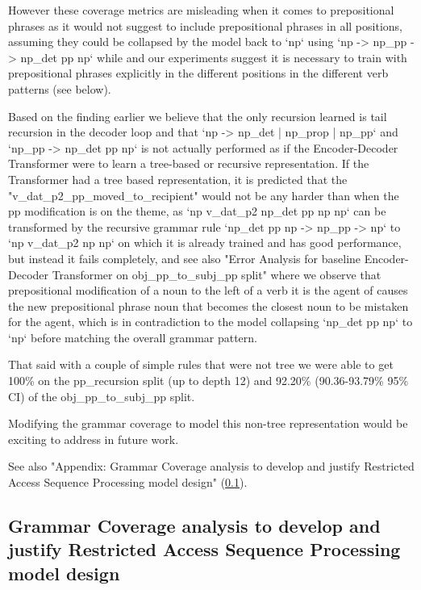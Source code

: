 \documentclass[11pt]{article}
\begin{document}
However these coverage metrics are misleading when it comes to prepositional phrases as it would not suggest to include prepositional phrases in all positions, assuming they could be collapsed by the model back to `np` using `np -> np\_pp -> np\_det pp np` while \cite{Wu2023} and our experiments suggest it is necessary to train with prepositional phrases explicitly in the different positions in the different verb patterns (see below).

Based on the finding earlier we believe that the only recursion learned is tail recursion in the decoder loop and that `np -> np\_det | np\_prop | np\_pp` and `np\_pp -> np\_det pp np` is not actually performed as if the Encoder-Decoder Transformer were to learn a tree-based or recursive representation. If the Transformer had a tree based representation, it is predicted that the "v\_dat\_p2\_pp\_moved\_to\_recipient" would not be any harder than when the pp modification is on the theme, as `np v\_dat\_p2 np\_det pp np np` can be transformed by the recursive grammar rule `np\_det pp np -> np\_pp -> np` to `np v\_dat\_p2 np np` on which it is already trained and has good performance, but instead it fails completely, and see also "Error Analysis for \cite{Wu2023} baseline Encoder-Decoder Transformer on obj\_pp\_to\_subj\_pp split" where we observe that prepositional modification of a noun to the left of a verb it is the agent of causes the new prepositional phrase noun that becomes the closest noun to be mistaken for the agent, which is in contradiction to the model collapsing `np\_det pp np` to `np` before matching the overall grammar pattern.

That said with a couple of simple rules that were not tree we were able to get 100\% on the pp\_recursion split (up to depth 12) and 92.20\% (90.36-93.79\% 95\% CI) of the obj\_pp\_to\_subj\_pp split.

Modifying the grammar coverage to model this non-tree representation would be exciting to address in future work.

See also "Appendix: Grammar Coverage analysis to develop and justify Restricted Access Sequence Processing model design" (\ref{grammar_coverage_analysis_for_model_design}).

\subsection{Grammar Coverage analysis to develop and justify Restricted Access Sequence Processing model design}
\label{grammar_coverage_analysis_for_model_design}
\end{document}
